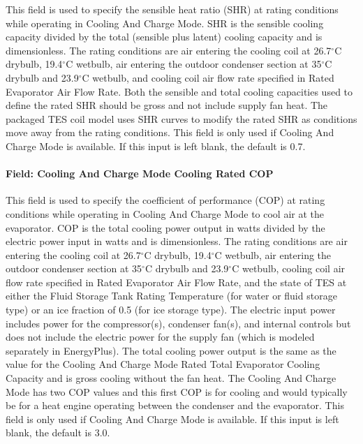 This field is used to specify the sensible heat ratio (SHR) at rating conditions while operating in Cooling And Charge Mode. SHR is the sensible cooling capacity divided by the total (sensible plus latent) cooling capacity and is dimensionless. The rating conditions are air entering the cooling coil at 26.7$^\circ$C drybulb, 19.4$^\circ$C wetbulb, air entering the outdoor condenser section at 35$^\circ$C drybulb and 23.9$^\circ$C wetbulb, and cooling coil air flow rate specified in Rated Evaporator Air Flow Rate. Both the sensible and total cooling capacities used to define the rated SHR should be gross and not include supply fan heat. The packaged TES coil model uses SHR curves to modify the rated SHR as conditions move away from the rating conditions. This field is only used if Cooling And Charge Mode is available. If this input is left blank, the default is 0.7.

\paragraph{Field: Cooling And Charge Mode Cooling Rated COP}\label{field-cooling-and-charge-mode-cooling-rated-cop}

This field is used to specify the coefficient of performance (COP) at rating conditions while operating in Cooling And Charge Mode to cool air at the evaporator. COP is the total cooling power output in watts divided by the electric power input in watts and is dimensionless. The rating conditions are air entering the cooling coil at 26.7$^\circ$C drybulb, 19.4$^\circ$C wetbulb, air entering the outdoor condenser section at 35$^\circ$C drybulb and 23.9$^\circ$C wetbulb, cooling coil air flow rate specified in Rated Evaporator Air Flow Rate, and the state of TES at either the Fluid Storage Tank Rating Temperature (for water or fluid storage type) or an ice fraction of 0.5 (for ice storage type). The electric input power includes power for the compressor(s), condenser fan(s), and internal controls but does not include the electric power for the supply fan (which is modeled separately in EnergyPlus). The total cooling power output is the same as the value for the Cooling And Charge Mode Rated Total Evaporator Cooling Capacity and is gross cooling without the fan heat. The Cooling And Charge Mode has two COP values and this first COP is for cooling and would typically be for a heat engine operating between the condenser and the evaporator. This field is only used if Cooling And Charge Mode is available. If this input is left blank, the default is 3.0.

